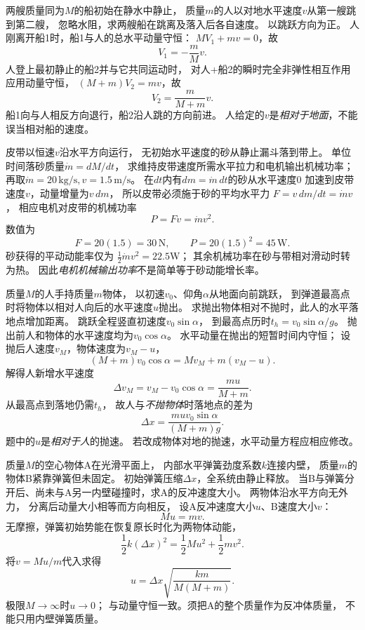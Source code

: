 \problemtext 两艘质量同为$M$的船初始在静水中静止，
质量$m$的人以对地水平速度$v$从第一艘跳到第二艘，
忽略水阻，求两艘船在跳离及落入后各自速度。
\workings
以跳跃方向为正。
人刚离开船1时，船1与人的总水平动量守恒：
$MV_1+mv=0$，故
\[
\boxed{V_1=-\frac mM v}.
\]
人登上最初静止的船2并与它共同运动时，
对人+船2的瞬时完全非弹性相互作用应用动量守恒，
$(M+m)V_2=mv$，故
\[
\boxed{V_2=\frac{m}{M+m}v}.
\]
\crosscheck 船1向与人相反方向退行，船2沿人跳的方向前进。
人给定的$v$是\emph{相对于地面}，不能误当相对船的速度。

\problemtext 皮带以恒速$v$沿水平方向运行，
无初始水平速度的砂从静止漏斗落到带上。
单位时间落砂质量$\dot m=dM/dt$，
求维持皮带速度所需水平拉力和电机输出机械功率；
再取$\dot m=20\,\mathrm{kg/s},v=1.5\,\mathrm{m/s}$。
\workings
在$dt$内有$dm=\dot m\,dt$的砂从水平速度0
加速到皮带速度$v$，动量增量为$v\,dm$，
所以皮带必须施于砂的平均水平力
$F=v\,dm/dt=\dot m v$，
相应电机对皮带的机械功率
\[
\boxed{P=Fv=\dot m v^2}.
\]
数值为
\[
\boxed{F=20(1.5)=30\,\mathrm N},\qquad
\boxed{P=20(1.5)^2=45\,\mathrm W}.
\]
\crosscheck 砂获得的平动动能率仅为
$\tfrac12\dot m v^2=22.5$W；
其余机械功率在砂与带相对滑动时转为热。
因此\emph{电机机械输出功率}不是简单等于砂动能增长率。

\problemtext 质量$M$的人手持质量$m$物体，
以初速$v_0$、仰角$\alpha$从地面向前跳跃，
到弹道最高点时将物体以相对人向后的水平速度$u$抛出。
求抛出物体相对不抛时，此人的水平落地点增加距离。
\workings
跳跃全程竖直初速度$v_0\sin\alpha$，
到最高点历时$t_h=v_0\sin\alpha/g$。
抛出前人和物体的水平速度均为$v_0\cos\alpha$。
水平动量在抛出的短暂时间内守恒；
设抛后人速度$v_M$，物体速度为$v_M-u$，
\[
(M+m)v_0\cos\alpha=Mv_M+m(v_M-u).
\]
解得人新增水平速度
\[
\Delta v_M=v_M-v_0\cos\alpha=\frac{mu}{M+m}.
\]
从最高点到落地仍需$t_h$，
故人与\emph{不抛物体}时落地点的差为
\[
\boxed{\Delta x=\frac{muv_0\sin\alpha}{(M+m)g}}.
\]
\crosscheck 题中的$u$是\emph{相对于人}的抛速。
若改成物体对地的抛速，水平动量方程应相应修改。

\problemtext 质量$M$的空心物体A在光滑平面上，
内部水平弹簧劲度系数$k$连接内壁，
质量$m$的物体B紧靠弹簧但未固定。
初始弹簧压缩$\Delta x$，全系统由静止释放。
当B与弹簧分开后、尚未与A另一内壁碰撞时，求A的反冲速度大小。
\workings
两物体沿水平方向无外力，
分离后动量大小相等而方向相反，
设A反冲速度大小$u$、B速度大小$v$：
\[
Mu=mv.
\]
无摩擦，弹簧初始势能在恢复原长时化为两物体动能，
\[
\frac12k(\Delta x)^2
=\frac12Mu^2+\frac12mv^2.
\]
将$v=Mu/m$代入求得
\[
\boxed{u=\Delta x\sqrt{\frac{km}{M(M+m)}}}.
\]
\crosscheck 极限$M\to\infty$时$u\to0$；
与动量守恒一致。须把A的整个质量作为反冲体质量，
不能只用内壁弹簧质量。

